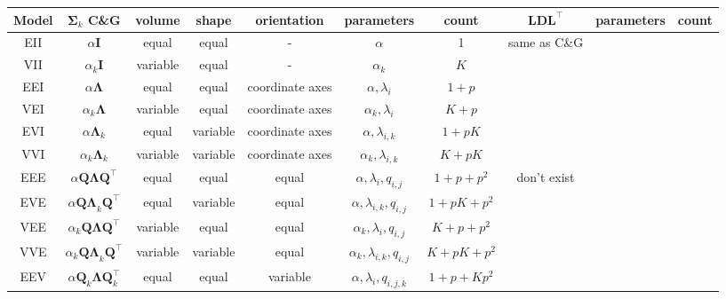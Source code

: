 \begin{table}[h]
	\centering
{}
{
	\begin{tabular}{| c | c c c c c c | c c c |}
		\hline
		Model & $\pmb{\Sigma}_k$ C\&G & volume & shape & orientation & parameters & count & $ \pmb{LDL}^\top $ & parameters & count \\
		\hline

		EII	& $ \alpha \pmb{I} $ & equal & equal & - & $ \alpha $ 
				& 1 & same as C\&G
						& & \\

		VII	& $ \alpha_k \pmb{I} $ 		& variable & equal & - & $ \alpha_k $ 
				& $ K $ &
					& & \\

		EEI	& $ \alpha \pmb{\Lambda} $ 	& equal & equal & coordinate axes & $ \alpha, \lambda_i $ 
				& $ 1+p $ &
					& & \\

		VEI	& $ \alpha_k \pmb{\Lambda} $ & variable & equal & coordinate axes & $ \alpha_k, \lambda_{i}$ 
				& $ K+p $ &
					& & \\

		EVI	& $ \alpha \pmb{\Lambda}_k $ &equal & variable & coordinate axes & $ \alpha, \lambda_{i,k} $ 
				& $ 1+pK $ &
					& & \\

		VVI	& $ \alpha_k \pmb{\Lambda}_k $ & variable & variable & coordinate axes & $ \alpha_k, \lambda_{i,k} $ 
				& $ K+pK $ &
					& & \\

		\hline

		EEE	& $ \alpha \pmb{Q \Lambda Q}^\top $ &equal & equal & equal & $ \alpha, \lambda_{i}, q_{i,j} $ 
				& $ 1+p+p^2 $ & don't exist
					& & \\

		EVE	& $ \alpha \pmb{Q \Lambda}_k \pmb{Q}^\top $ &equal & variable & equal & $ \alpha, \lambda_{i,k}, q_{i,j} $ 
				& $ 1+pK+p^2 $ &
					& & \\

		VEE	& $ \alpha_k \pmb{Q \Lambda Q}^\top $ & variable & equal & equal & $ \alpha_k, \lambda_{i}, q_{i,j} $ 
				& $ K+p+p^2 $ &
					& & \\
					
		VVE	& $ \alpha_k \pmb{Q \Lambda}_k \pmb{Q}^\top $ &variable & variable & equal & $ \alpha_k, \lambda_{i,k}, q_{i,j} $ 
				& $ K+pK+p^2 $ &
					& & \\

		EEV	& $ \alpha \pmb{Q}_k \pmb{\Lambda} \pmb{Q}_k^\top $ &equal & equal & variable & $ \alpha, \lambda_{i}, q_{i,j,k} $ 
				& $ 1+p+Kp^2 $ &
					& & \\


\end{tabular}}
\end{table}
